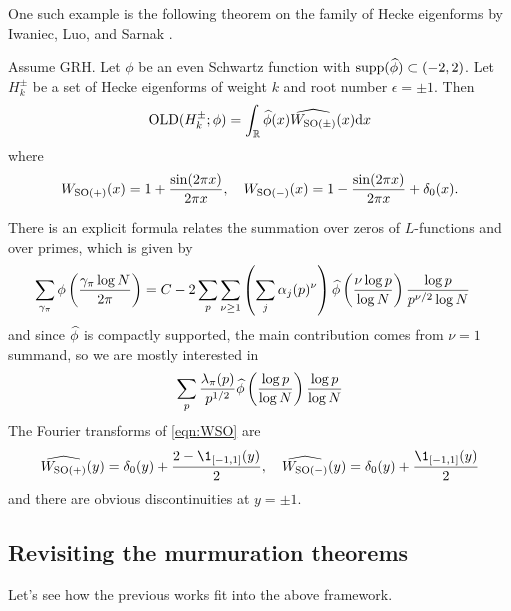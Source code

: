 One such example is the following theorem on the family of Hecke eigenforms by Iwaniec, Luo, and Sarnak \cite{iwaniec2000low}.
\begin{theorem}
    Assume GRH. Let $\phi$ be an even Schwartz function with $\mathrm{supp}(\widehat{\phi}) \subset (-2, 2)$.
    Let $H_k^\pm$ be a set of Hecke eigenforms of weight $k$ and root number $\epsilon = \pm 1$.
    Then
    \begin{equation}
        \mathrm{OLD}(H_k^\pm; \phi) = \int_{\mathbb{R}} \widehat{\phi}(x) \widehat{W_{\mathrm{SO}(\pm)}}(x) \mathrm{d} x
    \end{equation}
    where
    \begin{equation}
        \label{eqn:WSO}
        W_{\mathrm{SO}(+)}(x) = 1 + \frac{\sin(2\pi x)}{2 \pi x}, \quad W_{\mathrm{SO}(-)}(x) = 1 - \frac{\sin(2\pi x)}{2 \pi x} + \delta_0(x).
    \end{equation}
\end{theorem}
There is an explicit formula relates the summation over zeros of $L$-functions and over primes, which is given by \cite[Section 4]{iwaniec2000low}
\begin{align*}
    \sum_{\gamma_\pi} \phi\left(\frac{\gamma_\pi \log N}{2\pi}\right) &= C - 2 \sum_p \sum_{\nu \ge 1} \left(\sum_{j} \alpha_j(p)^\nu\right) \widehat{\phi}\left(\frac{\nu \log p}{\log N}\right) \frac{\log p}{p^{\nu/2} \log N}
\end{align*}
and since $\widehat{\phi}$ is compactly supported, the main contribution comes from $\nu = 1$ summand, so we are mostly interested in 
\begin{equation}
    \sum_{p} \frac{\lambda_\pi(p)}{p^{1/2}} \widehat{\phi}\left(\frac{\log p}{\log N}\right) \frac{\log p}{\log N} 
\end{equation}
The Fourier transforms of \eqref{eqn:WSO} are
\begin{equation}
    \what{W_{\SO(+)}}(y) = \delta_0(y) + \frac{2 - \1_{[-1, 1]}(y)}{2}, \quad \what{W_{\SO(-)}}(y) = \delta_0(y) + \frac{\1_{[-1, 1]}(y)}{2}
\end{equation}
and there are obvious discontinuities at $y = \pm 1$.


\subsection{Revisiting the murmuration theorems}

Let's see how the previous works \cite{zubrilina2025murmurations,lee2025murmurations,sawin2025murmurations} fit into the above framework.

